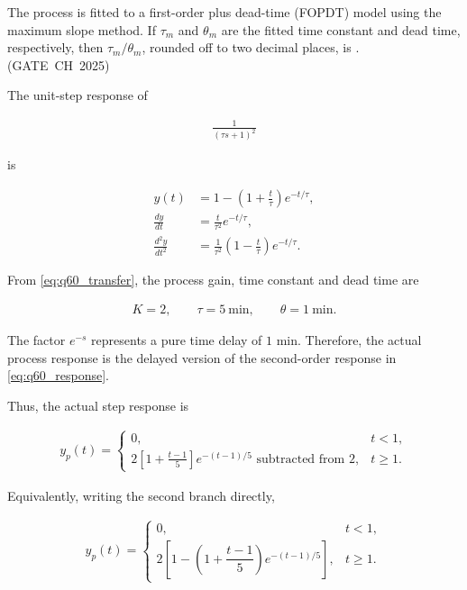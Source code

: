\begin{enumerate}[label=\thesubsection.\arabic*, ref=\thesubsection.\theenumi,itemsep=0pt]
The process is fitted to a first-order plus dead-time (FOPDT) model using
the maximum slope method. If $\tau_m$ and $\theta_m$ are the fitted time
constant and dead time, respectively, then
$\tau_m/\theta_m$, rounded off to two decimal places, is
\underline{\hspace{2cm}}.
\hfill (GATE~CH~2025)

The unit-step response of

\begin{align}
\frac{1}{(\tau s+1)^2}
\end{align}

is

\begin{align}
y(t)
&=1-\left(1+\frac{t}{\tau}\right)e^{-t/\tau},
\label{eq:q60_response}
\\
\frac{dy}{dt}
&=\frac{t}{\tau^2}e^{-t/\tau},
\label{eq:q60_first_derivative}
\\
\frac{d^2y}{dt^2}
&=\frac{1}{\tau^2}
\left(1-\frac{t}{\tau}\right)e^{-t/\tau}.
\label{eq:q60_second_derivative}
\end{align}

\solution

From \eqref{eq:q60_transfer}, the process gain, time constant and
dead time are

\begin{align}
K=2,\qquad
\tau=5~\text{min},\qquad
\theta=1~\text{min}.
\label{eq:q60_parameters}
\end{align}

The factor $e^{-s}$ represents a pure time delay of $1$ min.
Therefore, the actual process response is the delayed version of the
second-order response in \eqref{eq:q60_response}.

Thus, the actual step response is

\begin{align}
y_p(t)
=
\begin{cases}
0, & t<1,\\[4pt]
2\left[
1+\frac{t-1}{5}
\right]
e^{-(t-1)/5}
\text{ subtracted from }2,
& t\geq1.
\end{cases}
\end{align}

Equivalently, writing the second branch directly,

\begin{align}
y_p(t)
=
\begin{cases}
0, & t<1,\\[4pt]
2\left[
1-\left(1+\dfrac{t-1}{5}\right)
e^{-(t-1)/5}
\right],
& t\geq1.
\end{cases}
\label{eq:q60_actual_curve}
\end{align}


\end{enumerate}
